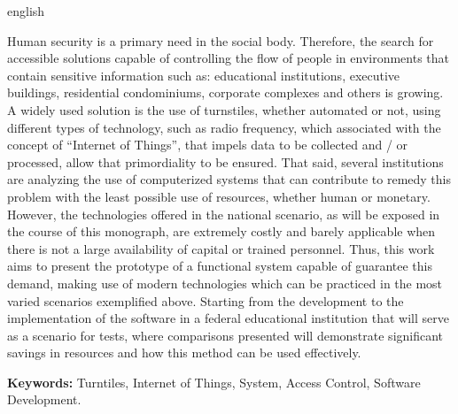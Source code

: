 \begin{resumo}[Abstract]
 \begin{otherlanguage*}{english}


Human security is a primary need in the social body. Therefore, the search for accessible solutions capable of controlling the flow of people in environments that contain sensitive information such as: educational institutions, executive buildings, residential condominiums, corporate complexes and others is growing. A widely used solution is the use of turnstiles, whether automated or not, using different types of technology, such as radio frequency, which associated with the concept of “Internet of Things”, that impels data to be collected and / or processed, allow that primordiality to be ensured. That said, several institutions are analyzing the use of computerized systems that can contribute to remedy this problem with the least possible use of resources, whether human or monetary. However, the technologies offered in the national scenario, as will be exposed in the course of this monograph, are extremely costly and barely applicable when there is not a large availability of capital or trained personnel. Thus, this work aims to present the prototype of a functional system capable of guarantee this demand, making use of modern technologies which can be practiced in the most varied scenarios exemplified above. Starting from the development to the implementation of the software in a federal educational institution that will serve as a scenario for tests, where comparisons presented will demonstrate significant savings in resources and how this method can be used effectively.

\textbf{Keywords: } Turntiles, Internet of Things, System, Access Control, Software Development.
 \end{otherlanguage*}
\end{resumo}
